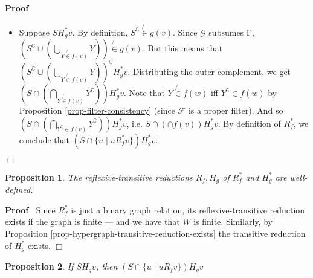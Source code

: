 \documentclass{article}
\newcommand{\tmtextbf}[1]{\text{{\bfseries{#1}}}}
\newenvironment{proof}{\noindent\textbf{Proof\ }}{\hspace*{\fill}$\Box$\medskip}
\newtheorem{proposition}{Proposition}
\begin{document}
\begin{proof}
\begin{itemize}
    \item \tmtextbf{$H_g^{\ast}$ includes $R_f^{\ast}$:} Suppose $S H^{\ast}_g
    v$. By definition, $S^{\complement} \not{\in} g (v)$. Since $\mathcal{G}$
    subsumes  F, $\left( S^{\complement} \cup \left( \bigcup_{Y \not{\in} f
    (v)} Y \right) \right) \not{\in} g (v)$. But this means that $\left(
    S^{\complement} \cup \left( \bigcup_{Y \not{\in} f (v)} Y \right)
    \right)^{\complement} H^{\ast}_g v$. Distributing the outer complement, we
    get $\left( S \cap \left( \bigcap_{Y \not{\in} f (v)} Y^{\complement}
    \right) \right) H^{\ast}_g v$. Note that $Y \not{\in} f (w)$ iff
    $Y^{\complement} \in f (w)$ by Proposition \ref{prop-filter-consistency}
    (since $\mathcal{F}$ is a proper filter). And so $\left( S \cap \left(
    \bigcap_{Y^{\complement} \in f (v)} Y^{\complement} \right) \right)
    H^{\ast}_g v$, i.e. $S \cap (\cap f (v)) H^{\ast}_g v$. By definition of
    $R^{\ast}_f$, we conclude that $(S \cap \{ u \mid u R^{\ast}_f v \})
    H^{\ast}_g v$.
  \end{itemize}
  
\end{proof}

\begin{proposition}
  The reflexive-transitive reductions $R_f, H_g$ of $R_f^{\ast}$ and
  $H_g^{\ast}$ are well-defined.
\end{proposition}

\begin{proof}
  Since $R_f^{\ast}$ is just a binary graph relation, its reflexive-transitive
  reduction exists if the graph is finite --- and we have that $W$ is finite.
  Similarly, by Proposition \ref{prop-hypergraph-transitive-reduction-exists}
  the transitive reduction of $H_g^{\ast}$ exists.
\end{proof}

\begin{proposition}
  \label{prop-hyperedge-restriction}If $S H_g v$, then $(S \cap \{ u \mid u
  R_f v \}) H_g v$
\end{proposition}
\end{document}
